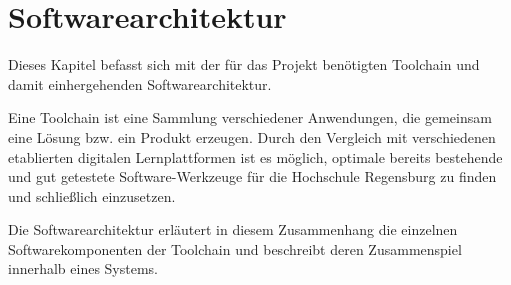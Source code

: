 \section{Softwarearchitektur}\label{softwarearchitektur}
Dieses Kapitel befasst sich mit der für das Projekt benötigten Toolchain und
damit einhergehenden Softwarearchitektur.

Eine Toolchain ist eine Sammlung verschiedener Anwendungen, die gemeinsam eine
Lösung bzw. ein Produkt erzeugen. Durch den Vergleich mit verschiedenen
etablierten digitalen Lernplattformen ist es möglich, optimale bereits
bestehende und gut getestete Software-Werkzeuge für die Hochschule Regensburg zu
finden und schließlich einzusetzen.

Die Softwarearchitektur erläutert in diesem Zusammenhang die einzelnen
Softwarekomponenten der Toolchain und beschreibt deren Zusammenspiel innerhalb
eines Systems.



\newpage


\newpage
